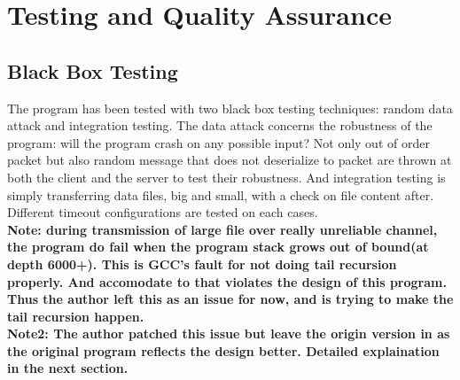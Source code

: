 \documentclass[12pt]{article}
\begin{document}
\section{Testing and Quality Assurance}
\subsection{Black Box Testing}
The program has been tested with two black box testing techniques: random data attack and integration testing. The data attack concerns the robustness of the program: will the program crash on any possible input? Not only out of order packet but also random message that does not deserialize to packet are thrown at both the client and the server to test their robustness. And integration testing is simply transferring data files, big and small, with a check on file content after. Different timeout configurations are tested on each cases. \\\textbf{Note: during transmission of large file over really unreliable channel, the program do fail when the program stack grows out of bound(at depth 6000+). This is GCC's fault for not doing tail recursion properly. And accomodate to that violates the design of this program. Thus the author left this as an issue for now, and is trying to make the tail recursion happen.}
\\\textbf{Note2: The author patched this issue but leave the origin version in as the original program reflects the design better. Detailed explaination in the next section.}
\end{document}
